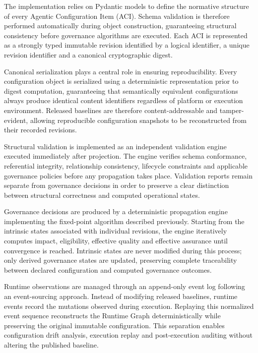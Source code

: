 \documentclass[10pt]{article}
\begin{document}
The implementation relies on Pydantic models to define the normative structure of every Agentic Configuration Item (ACI). Schema validation is therefore performed automatically during object construction, guaranteeing structural consistency before governance algorithms are executed. Each ACI is represented as a strongly typed immutable revision identified by a logical identifier, a unique revision identifier and a canonical cryptographic digest.

Canonical serialization plays a central role in ensuring reproducibility. Every configuration object is serialized using a deterministic representation prior to digest computation, guaranteeing that semantically equivalent configurations always produce identical content identifiers regardless of platform or execution environment. Released baselines are therefore content-addressable and tamper-evident, allowing reproducible configuration snapshots to be reconstructed from their recorded revisions.

Structural validation is implemented as an independent validation engine executed immediately after projection. The engine verifies schema conformance, referential integrity, relationship consistency, lifecycle constraints and applicable governance policies before any propagation takes place. Validation reports remain separate from governance decisions in order to preserve a clear distinction between structural correctness and computed operational states.

Governance decisions are produced by a deterministic propagation engine implementing the fixed-point algorithm described previously. Starting from the intrinsic states associated with individual revisions, the engine iteratively computes impact, eligibility, effective quality and effective assurance until convergence is reached. Intrinsic states are never modified during this process; only derived governance states are updated, preserving complete traceability between declared configuration and computed governance outcomes.

Runtime observations are managed through an append-only event log following an event-sourcing approach. Instead of modifying released baselines, runtime events record the mutations observed during execution. Replaying this normalized event sequence reconstructs the Runtime Graph deterministically while preserving the original immutable configuration. This separation enables configuration drift analysis, execution replay and post-execution auditing without altering the published baseline.
\end{document}
